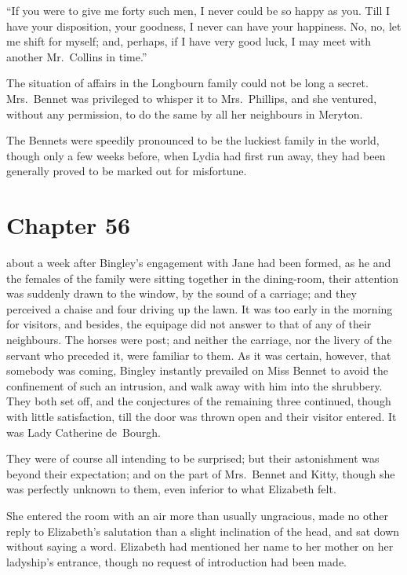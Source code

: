 ``If you were to give me forty such men, I never could be so
happy as you.  Till I have your disposition, your goodness,
I never can have your happiness.  No, no, let me shift for
myself; and, perhaps, if I have very good luck, I may meet
with another Mr.\ Collins in time.''

The situation of affairs in the Longbourn family could not be
long a secret.  Mrs.\ Bennet was privileged to whisper it to
Mrs.\ Phillips, and she ventured, without any permission, to do
the same by all her neighbours in Meryton.

The Bennets were speedily pronounced to be the luckiest family
in the world, though only a few weeks before, when Lydia had
first run away, they had been generally proved to be marked out
for misfortune.



\chapter{Chapter 56}


 about a week after Bingley's engagement with
Jane had been formed, as he and the females of the family
were sitting together in the dining-room, their attention
was suddenly drawn to the window, by the sound of a carriage;
and they perceived a chaise and four driving up the lawn.
It was too early in the morning for visitors, and besides, the
equipage did not answer to that of any of their neighbours.
The horses were post; and neither the carriage, nor the livery
of the servant who preceded it, were familiar to them.  As it
was certain, however, that somebody was coming, Bingley
instantly prevailed on Miss Bennet to avoid the confinement of
such an intrusion, and walk away with him into the shrubbery.
They both set off, and the conjectures of the remaining three
continued, though with little satisfaction, till the door was
thrown open and their visitor entered.  It was Lady Catherine
de~Bourgh.

They were of course all intending to be surprised; but their
astonishment was beyond their expectation; and on the part of
Mrs.\ Bennet and Kitty, though she was perfectly unknown to
them, even inferior to what Elizabeth felt.

She entered the room with an air more than usually ungracious,
made no other reply to Elizabeth's salutation than a slight
inclination of the head, and sat down without saying a word.
Elizabeth had mentioned her name to her mother on her ladyship's
entrance, though no request of introduction had been made.

